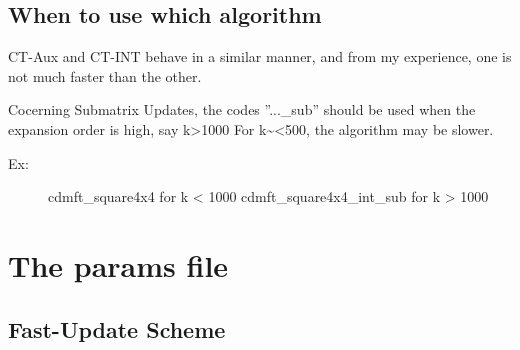 \documentclass[letterpaper,10pt,english]{sphinxmanual}
\begin{document}
\section{When to use which algorithm}
\label{\detokenize{tutorial:when-to-use-which-algorithm}}
CT-Aux and CT-INT behave in a similar manner, and from my experience, one is not much faster than the other.

Cocerning Submatrix Updates, the codes ''...\_sub'' should be used when the expansion order is high, say k\textgreater{}1000
For k\textasciitilde{}\textless{}500, the algorithm may be slower.
\begin{description}
\item[{Ex:}] \leavevmode
cdmft\_square4x4 for k \textless{} 1000
cdmft\_square4x4\_int\_sub for k \textgreater{} 1000

\end{description}


\chapter{The params file}
\label{\detokenize{params:the-params-file}}\label{\detokenize{params::doc}}

\section{Fast-Update Scheme}
\label{\detokenize{params:fast-update-scheme}}
\end{document}
